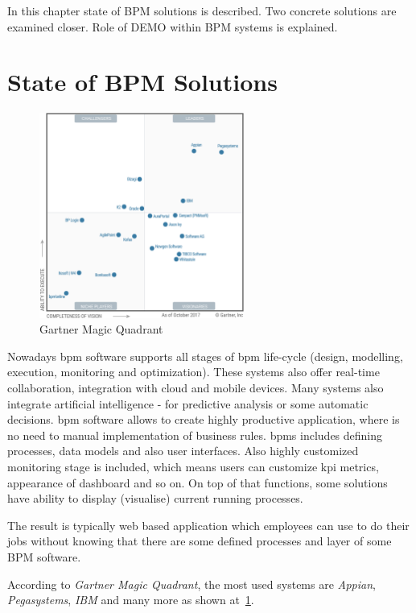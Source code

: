 In this chapter state of BPM solutions is described. Two concrete solutions are examined closer. Role of DEMO within BPM systems is explained. 
\section{State of BPM Solutions}
\begin{figure}[ht!]
	\centering
    \includegraphics[width=0.6\textwidth, keepaspectratio]{img/gartner-magic-quadrant.png}
    \caption{Gartner Magic Quadrant\cite{gartner-2017} }
    \label{fig:gartner-magic-quadrant}
\end{figure}

Nowadays \gls{bpm} software supports all stages of \gls{bpm} life-cycle (design, modelling, execution, monitoring and optimization). These systems also offer real-time collaboration, integration with cloud and mobile devices. Many systems also integrate artificial intelligence - for predictive analysis or some automatic decisions. \gls{bpm} software allows to create highly productive application, where is no need to manual implementation of business rules. \gls{bpms} includes defining processes, data models and also user interfaces. Also highly customized monitoring stage is included, which means users can customize \gls{kpi} metrics, appearance of dashboard and so on. On top of that functions, some solutions have ability to display (visualise) current running processes.  

The result is typically web based application which employees can use to do their jobs without knowing that there are some defined processes and layer of some BPM software. 

According to \textit{Gartner Magic Quadrant}\cite{gartner-2017}, the most used systems are \textit{Appian}, \textit{Pegasystems}, \textit{IBM} and many more as shown at~\cref{fig:gartner-magic-quadrant}.

